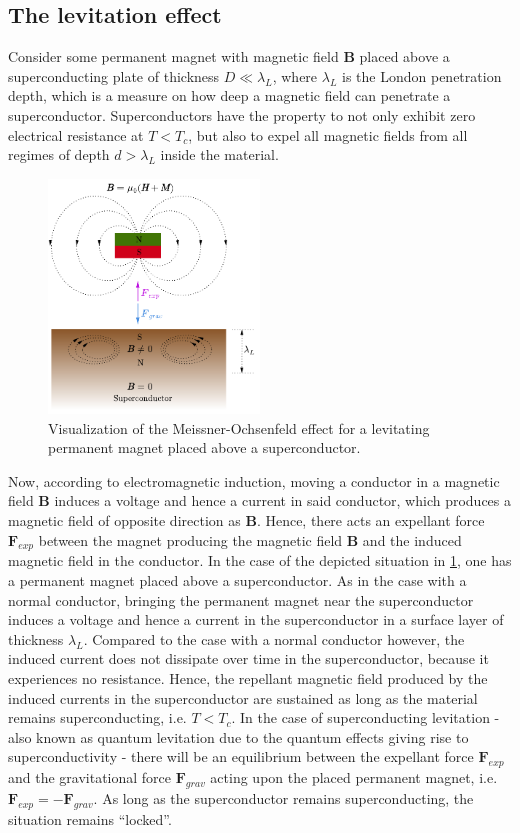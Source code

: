 \documentclass{report}
\numberwithin{tm}{section}
\newcommand\vect[1]{\ensuremath{\bm{#1}}}
\begin{document}
\subsection{The levitation effect}
Consider some permanent magnet with magnetic field $\vect{B}$ placed above a superconducting plate of thickness $D \ll \lambda_L$, where $\lambda_L$ is the London penetration depth, which is a measure on how deep a magnetic field can penetrate a superconductor. Superconductors have the property to not only exhibit zero electrical resistance at $T < T_c$, but also to expel all magnetic fields from all regimes of depth $d > \lambda_L$ inside the material.
\begin{figure}[h]
	\centering
	\includegraphics[width=0.5\textwidth]{figures/meissner-ochsenfeld.pdf}
	\caption{Visualization of the Meissner-Ochsenfeld effect for a levitating permanent magnet placed above a superconductor.}
	\label{fig:meissner-ochsenfeld}
\end{figure}

Now, according to electromagnetic induction, moving a conductor in a magnetic field $\vect{B}$ induces a voltage and hence a current in said conductor, which produces a magnetic field of opposite direction as $\vect{B}$. Hence, there acts an expellant force $\vect{F}_{exp}$ between the magnet producing the magnetic field $\vect{B}$ and the induced magnetic field in the conductor. In the case of the depicted situation in \cref{fig:meissner-ochsenfeld}, one has a permanent magnet placed above a superconductor. As in the case with a normal conductor, bringing the permanent magnet near the superconductor induces a voltage and hence a current in the superconductor in a surface layer of thickness $\lambda_L$. Compared to the case with a normal conductor however, the induced current does not dissipate over time in the superconductor, because it experiences no resistance. Hence, the repellant magnetic field produced by the induced currents in the superconductor are sustained as long as the material remains superconducting, i.e. $T < T_c$. In the case of superconducting levitation - also known as quantum levitation due to the quantum effects giving rise to superconductivity - there will be an equilibrium between the expellant force $\vect{F}_{exp}$ and the gravitational force $\vect{F}_{grav}$ acting upon the placed permanent magnet, i.e. $\vect{F}_{exp} = -\vect{F}_{grav}$. As long as the superconductor remains superconducting, the situation remains ``locked''.
\end{document}
